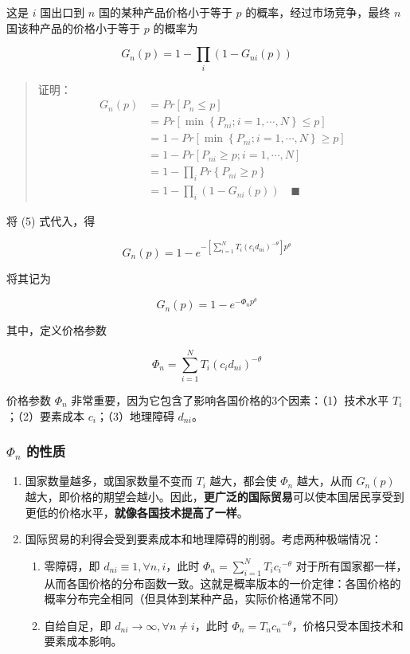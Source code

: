 \documentclass[
]{article}
\providecommand{\tightlist}{%
  \setlength{\itemsep}{0pt}\setlength{\parskip}{0pt}}
\begin{document}
这是 \(i\) 国出口到 \(n\) 国的某种产品价格小于等于 \(p\) 的概率，经过市场竞争，最终
\(n\) 国该种产品的价格小于等于 \(p\) 的概率为

\[
G_n(p) =1-\prod_{i}{(1-G_{ni}\left(p\right))}
\]

\begin{quote}
证明：\[\begin{aligned}
G_n(p) &= Pr[P_n \le p] \\ 
&=Pr[ \min \left\{P_{n i} ; i=1, \cdots, N\right\} \le p] \\ 
&= 1 - Pr[ \min \left\{P_{n i} ; i=1, \cdots, N\right\} \geq p] \\ 
&= 1- Pr[ P_{n i}  \geq p; i=1, \cdots, N]\\ &=1-\prod_{i}Pr\left\{P_{ni}\geq p\right\} \\ 
&=1-\prod_{i}{(1-G_{ni}\left(p\right))} \quad \blacksquare 
\end{aligned}\]
\end{quote}

将 (5) 式代入，得

\[
G_n\left(p\right)=1-e^{-[\sum_{i=1}^{N}T_{i} ( {{c_i}d_{ni}})^{-\theta}]p^{\theta}} 
\]

将其记为

\[
G_{n}(p)=1-e^{-\Phi_{n} p^{\theta}}  \tag{6}
\]

其中，定义价格参数

\[
\Phi_{n} = \sum_{i=1}^{N}T_{i} ( {{c_i}d_{ni}})^{-\theta} \tag{7}
\]

价格参数 \(\Phi_n\) 非常重要，因为它包含了影响各国价格的3个因素：（1）技术水平
\(T_i\)；（2）要素成本 \(c_i\)；（3）地理障碍 \(d_{ni}\)。

\hypertarget{phi_n-ux7684ux6027ux8d28}{%
\subsubsection{\texorpdfstring{\(\Phi_n\) 的性质}{\textbackslash Phi\_n 的性质}}\label{phi_n-ux7684ux6027ux8d28}}

\begin{enumerate}
\def\labelenumi{\arabic{enumi}.}
\tightlist
\item
  国家数量越多，或国家数量不变而 \(T_i\) 越大，都会使 \(\Phi_n\) 越大，从而
  \(G_{n}(p)\)
  越大，即价格的期望会越小。因此，\textbf{更广泛的国际贸易}可以使本国居民享受到更低的价格水平，\textbf{就像各国技术提高了一样}。
\item
  国际贸易的利得会受到要素成本和地理障碍的削弱。考虑两种极端情况：

  \begin{enumerate}
  \def\labelenumii{\alph{enumii}.}
  \tightlist
  \item
    零障碍，即 \(d_{n i} \equiv 1, \forall n, i\)，此时
    \(\Phi_{n} = \sum_{i=1}^{N}T_{i}{c_i}^{-\theta}\)
    对于所有国家都一样，从而各国价格的分布函数一致。这就是概率版本的一价定律：各国价格的概率分布完全相同（但具体到某种产品，实际价格通常不同）
  \item
    自给自足，即 \(d_{n i} \rightarrow \infty, \forall n \neq i\)，此时
    \(\Phi_{n} = T_{n}{c_n}^{-\theta}\)，价格只受本国技术和要素成本影响。
  \end{enumerate}
\end{enumerate}
\end{document}
